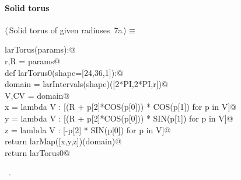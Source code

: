 \documentclass[11pt,oneside]{article}	%
\begin{document}
\paragraph{Solid torus}
\begin{flushleft} \small \label{scrap15}
\protect{}$\langle\,$Solid torus of given radiuses\nobreak\ {\footnotesize 7a}$\,\rangle\equiv$
\vspace{-1ex}
\begin{list}{}{} \item
\mbox{}\verb@def larTorus(params):@\\
\mbox{}\verb@   r,R = params@\\
\mbox{}\verb@   def larTorus0(shape=[24,36,1]):@\\
\mbox{}\verb@      domain = larIntervals(shape)([2*PI,2*PI,r])@\\
\mbox{}\verb@      V,CV = domain@\\
\mbox{}\verb@      x = lambda V : [(R + p[2]*COS(p[0])) * COS(p[1]) for p in V]@\\
\mbox{}\verb@      y = lambda V : [(R + p[2]*COS(p[0])) * SIN(p[1]) for p in V]@\\
\mbox{}\verb@      z = lambda V : [-p[2] * SIN(p[0]) for p in V]@\\
\mbox{}\verb@      return larMap([x,y,z])(domain)@\\
\mbox{}\verb@   return larTorus0@\\
\mbox{}\verb@@{\NWsep}
\end{list}
\vspace{-1ex}
\footnotesize\addtolength{\baselineskip}{-1ex}
\begin{list}{}{\setlength{\itemsep}{-\parsep}\setlength{\itemindent}{-\leftmargin}}
\item \NWtxtMacroRefIn\ .
\end{list}
\end{flushleft}
\end{document}
